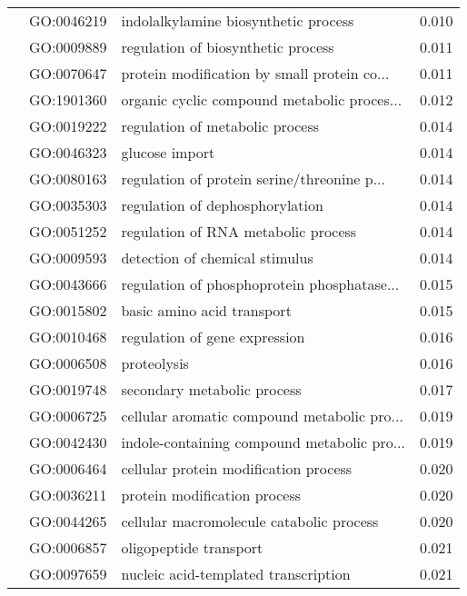 \begin{longtable}{lllr}
   & GO:0046219 &         indolalkylamine biosynthetic process &         0.010 \\
   & GO:0009889 &           regulation of biosynthetic process &         0.011 \\
   & GO:0070647 &  protein modification by small protein co... &         0.011 \\
   & GO:1901360 &  organic cyclic compound metabolic proces... &         0.012 \\
   & GO:0019222 &              regulation of metabolic process &         0.014 \\
   & GO:0046323 &                               glucose import &         0.014 \\
   & GO:0080163 &  regulation of protein serine/threonine p... &         0.014 \\
   & GO:0035303 &              regulation of dephosphorylation &         0.014 \\
   & GO:0051252 &          regulation of RNA metabolic process &         0.014 \\
   & GO:0009593 &               detection of chemical stimulus &         0.014 \\
   & GO:0043666 &  regulation of phosphoprotein phosphatase... &         0.015 \\
   & GO:0015802 &                   basic amino acid transport &         0.015 \\
   & GO:0010468 &                regulation of gene expression &         0.016 \\
   & GO:0006508 &                                  proteolysis &         0.016 \\
   & GO:0019748 &                  secondary metabolic process &         0.017 \\
   & GO:0006725 &  cellular aromatic compound metabolic pro... &         0.019 \\
   & GO:0042430 &  indole-containing compound metabolic pro... &         0.019 \\
   & GO:0006464 &        cellular protein modification process &         0.020 \\
   & GO:0036211 &                 protein modification process &         0.020 \\
   & GO:0044265 &     cellular macromolecule catabolic process &         0.020 \\
   & GO:0006857 &                       oligopeptide transport &         0.021 \\
   & GO:0097659 &         nucleic acid-templated transcription &         0.021 \\

\end{longtable}
